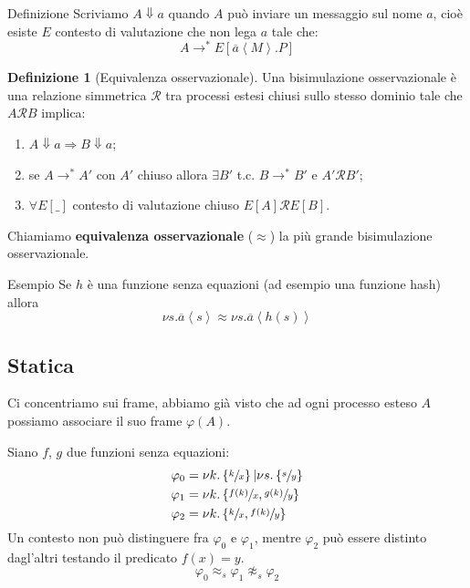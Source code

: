\documentclass{beamer}
\newcounter{counter1}
\theoremstyle{plain}
\theoremstyle{definition}
\newtheorem{mydef}[counter1]{Definizione}
\theoremstyle{remark}
\newcommand{\obar}[1]{\overline{#1}}
\newcommand{\set}[1]{\left\{#1\right\}}
\newcommand{\ang}[1]{\left<#1\right>}
\newcommand{\bra}[1]{\left[#1\right]}
\begin{document}
\begin{frame}{Definizione}
  Scriviamo $A \Downarrow a$ quando $A$ pu\`o inviare un messaggio sul
  nome $a$, cio\`e esiste $E$ contesto di valutazione che non lega $a$
  tale che:
  \[ A \rightarrow ^* E\bra{ \obar{a}\ang{M}.P} \]

  \begin{mydef}[Equivalenza osservazionale]
    Una bisimulazione osservazionale \`e una relazione simmetrica
    $\mathcal{R}$ tra processi estesi chiusi sullo stesso dominio tale
    che $A \mathcal{R} B$ implica:
    \begin{enumerate}
    \item $A \Downarrow a \Rightarrow B \Downarrow a$;
    \item se $A \rightarrow ^* A'$ con $A'$ chiuso allora $\exists B'$
      t.c. $B \rightarrow ^* B'$ e $A' \mathcal{R} B'$;
    \item $\forall E[\_]$ contesto di valutazione chiuso $E[A]
      \mathcal{R} E[B]$.
    \end{enumerate}
    Chiamiamo \textbf{equivalenza osservazionale} ($\approx$) la pi\`u
    grande bisimulazione osservazionale.
  \end{mydef}
\end{frame}

\begin{frame}{Esempio}
  Se $h$ \`e una funzione senza equazioni (ad esempio una funzione
  hash) allora
  \[ \nu s. \obar{a}\ang{s} \approx \nu s. \obar{a}\ang{h(s)} \]
\end{frame}

\subsection{Statica}

\begin{frame}
  Ci concentriamo sui frame, abbiamo gi\`a visto che ad ogni processo
  esteso $A$ possiamo associare il suo frame $\varphi (A)$.
  \vfill
  
  Siano $f$, $g$ due funzioni senza equazioni:
  \begin{align*}
    \varphi _0 &= \nu k.\set{\sfrac{k}{x}} | \nu s. \set{\sfrac{s}{y}}
    \\
    \varphi _1 &= \nu k.\set{ \sfrac{f(k)}{x}, \sfrac{g(k)}{y}} \\
    \varphi _2 &= \nu k.\set{ \sfrac{k}{x}, \sfrac{f(k)}{y}} 
  \end{align*}
  Un contesto non pu\`o distinguere fra $\varphi _0$ e $\varphi _1$,
  mentre $\varphi _2$ pu\`o essere distinto dagl'altri testando il
  predicato $f(x) = y$.
  \[ \varphi _0 \approx _s \varphi _1 \not \approx _s \varphi _2 \]
\end{frame}
\end{document}
